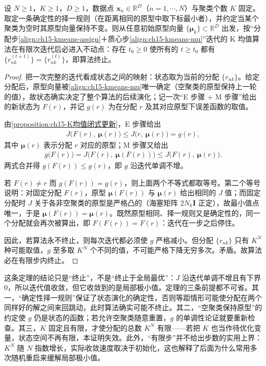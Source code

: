 \documentclass[../../main.tex]{subfiles}
\begin{document}
\begin{theorem}[K 均值算法的有限步终止]\label{theorem:ch15-K均值收敛}
设 $N\geqslant1$，$K\geqslant1$，$D\geqslant1$，数据点 $\bm{x}_n\in\mathbb{R}^{D}$（$n=1,\cdots,N$）与聚类个数 $K$ 固定。取定一条确定性的择一规则（在距离相同的原型中取下标最小者），并约定当某个聚类为空时其原型向量保持不变。则从任意初始原型向量 $\{\bm{\mu}_k\}\subset\mathbb{R}^{D}$ 出发，按“分配步\eqref{align:ch15-kmeans-assign}＋质心步\eqref{align:ch15-kmeans-mu}”迭代的 K 均值算法在有限次迭代后必进入不动点：存在 $t_{0}\geqslant0$ 使所有的 $t\geqslant t_{0}$ 都有 $\{r_{nk}^{(t+1)}\}=\{r_{nk}^{(t)}\}$，即算法终止。
\end{theorem}
\begin{proof}
把一次完整的迭代看成状态之间的映射：状态取为当前的分配 $\{r_{nk}\}$。给定分配后，原型向量被\eqref{align:ch15-kmeans-mu}唯一确定（空聚类的原型保持上一轮的值），故状态确实决定了整个算法的后续演化；记一次“E 步骤 + M 步骤”给出的新状态为 $F(r)$，并记 $g(r)$ 为在分配 $r$ 及其对应原型下误差函数的取值。

由\cref{proposition:ch15-K均值闭式更新}，E 步骤给出
\begin{align*}
J\big(F(r),\ \bm{\mu}(r)\big)\leqslant J\big(r,\ \bm{\mu}(r)\big)=g(r),
\end{align*}
其中 $\bm{\mu}(r)$ 表示分配 $r$ 对应的原型；M 步骤又给出
\begin{align*}
g\big(F(r)\big)=J\big(F(r),\ \bm{\mu}(F(r))\big)\leqslant J\big(F(r),\ \bm{\mu}(r)\big).
\end{align*}
两式合并得 $g(F(r))\leqslant g(r)$，即 $g$ 沿迭代单调不增。

若 $F(r)\neq r$ 而 $g(F(r))=g(r)$，则上面两个不等式都取等号。第二个等号说明：对固定分配 $F(r)$，原型 $\bm{\mu}(F(r))$ 与 $\bm{\mu}(r)$ 给出相同的 $J$ 值；而固定分配时 $J$ 关于各非空聚类的原型是严格凸的（海塞矩阵 $2N_k\bm{I}$ 正定），故最小值点唯一，于是 $\bm{\mu}(F(r))=\bm{\mu}(r)$。既然原型相同、择一规则又是确定性的，同一个分配就会再次被算出，即 $F(F(r))=F(r)$：迭代在一步之后停住。

因此，若算法永不终止，则每次迭代都必须使 $g$ 严格减小。但分配 $\{r_{nk}\}$ 只有 $K^{N}$ 种可能取值，$g$ 至多取 $K^{N}$ 个不同的值，不可能严格下降无穷多次。矛盾。故算法必在有限步内终止。
\end{proof}

\begin{remark}
这条定理的结论只是“终止”，不是“终止于全局最优”：$J$ 沿迭代单调不增且有下界 $0$，所以迭代值收敛，但它收敛到的是局部极小值。定理的三条前提都不可省。其一，“确定性择一规则”保证了状态演化的确定性，否则等距情形可能使分配在两个同样好的解之间来回跳动，此时算法确实可能不终止。其二，“空聚类保持原型”的约定使 $g$ 仍是状态的函数；若允许空聚类随意重置，$g$ 的单调性论证就要重新检查。其三，$K$ 固定且有限，才使分配的总数 $K^{N}$ 有限——若把 $K$ 也当作待优化变量，状态空间不再有限，本证明失效。此外，“有限步”并不给出步数的实用上界：$K^{N}$ 随 $N$ 指数增长，实际收敛速度取决于初始化，这也解释了后面为什么常用多次随机重启来缓解局部极小值。
\end{remark}
\end{document}
